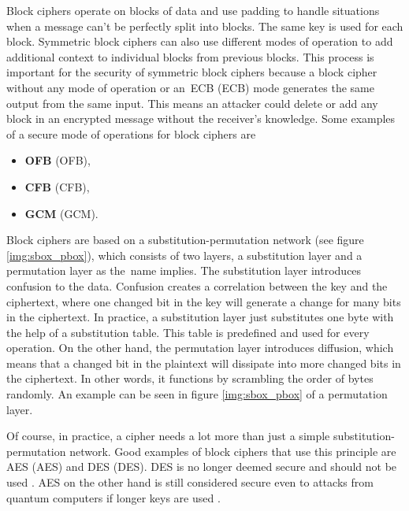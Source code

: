 Block ciphers operate on blocks of data and use padding to handle situations when a message can't be perfectly split into blocks. The same key is used for each block. Symmetric block ciphers can also use different modes of operation to add additional context to individual blocks from previous blocks. This process is important for the security of symmetric block ciphers because a block cipher without any mode of operation or an~ECB (\acl{ECB}) mode generates the same output from the same input. This means an attacker could delete or add any block in an encrypted message without the receiver's knowledge. Some examples of a secure mode of operations for block ciphers are \cite{Paar2010}
\begin{itemize}
  \item \textbf{OFB} (\acl{OFB}),
  \item \textbf{CFB} (\acl{CFB}),
  \item \textbf{GCM} (\acl{GCM}).
\end{itemize}

Block ciphers are based on a substitution-permutation network (see figure \ref{img:sbox_pbox}), which consists of two layers, a substitution layer and a permutation layer as the~name implies. The substitution layer introduces confusion to the data. Confusion creates a correlation between the key and the ciphertext, where one changed bit in the key will generate a change for many bits in the ciphertext. In practice, a substitution layer just substitutes one byte with the help of a substitution table. This table is predefined and used for every operation. On the other hand, the permutation layer introduces diffusion, which means that a changed bit in the plaintext will dissipate into more changed bits in the ciphertext. In other words, it functions by scrambling the order of bytes randomly. An example can be seen in figure \ref{img:sbox_pbox} of a permutation layer. \cite{Paar2010}\cite{Shannon1949}

Of course, in practice, a cipher needs a lot more than just a simple substitution-permutation network. Good examples of block ciphers that use this principle are AES (\acl{AES}) and DES (\acl{DES}). DES is no longer deemed secure and should not be used \cite{Barker2017}. AES on the other hand is still considered secure even to attacks from quantum computers if longer keys are used \cite{Chen2016}.

